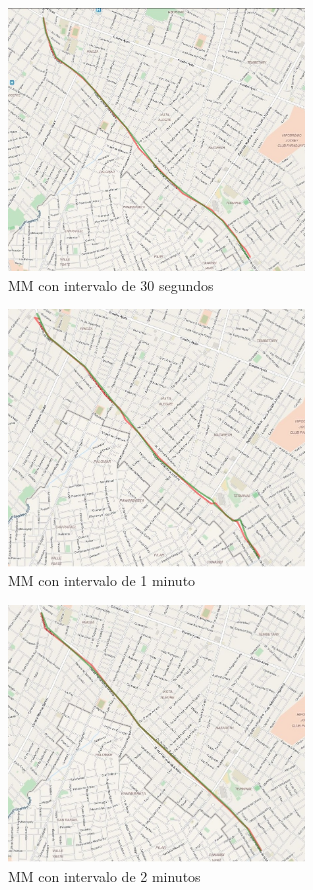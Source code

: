 \begin{figure}[!htb]
	\centering
	\includegraphics[width=0.7\textwidth]{capitulos/7/figuras/figura1.jpg}
	\caption{\label{fig:mm_30s} MM con intervalo de 30 segundos}	
\end{figure}

\begin{figure}[!htb]
	\centering
	\includegraphics[width=0.7\textwidth]{capitulos/7/figuras/figura2.jpg}
	\caption{\label{fig:mm_1m} MM con intervalo de 1 minuto}	
\end{figure}

\begin{figure}[!htb]
	\centering
	\includegraphics[width=0.7\textwidth]{capitulos/7/figuras/figura3.jpg}
	\caption{\label{fig:mm_2m} MM con intervalo de 2 minutos}	
\end{figure}

